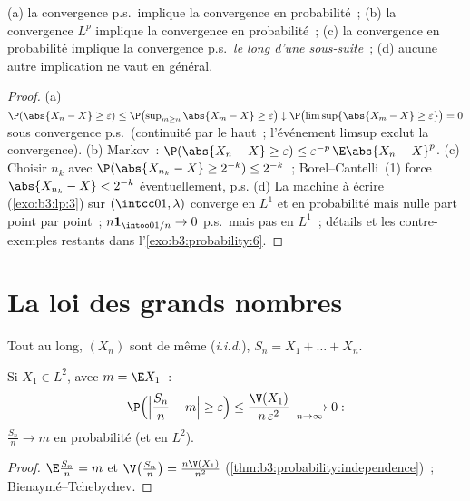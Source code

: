 \begin{proposition}\label{prop:b3:probability:modes}
(a) la convergence p.s.\ implique la convergence en
probabilité~;
(b) la convergence $L^p$ implique la convergence en
probabilité~;
(c) la convergence en probabilité implique la convergence
p.s.\ \emph{le long d'une sous-suite}~;
(d) aucune autre implication ne vaut en général.
\end{proposition}

\begin{proof}
(a) $\P(\abs{X_n - X} \geq \varepsilon) \leq
\P\bigl(\sup_{m\geq n}\abs{X_m - X} \geq \varepsilon\bigr)
\downarrow \P\bigl(\limsup\{\abs{X_m - X} \geq
\varepsilon\}\bigr) = 0$ sous convergence p.s.\ (continuité
par le haut~; l'événement limsup exclut la convergence).
(b) Markov~: $\P(\abs{X_n - X} \geq \varepsilon) \leq
\varepsilon^{-p}\,\E\abs{X_n - X}^p$. (c) Choisir $n_k$ avec
$\P(\abs{X_{n_k} - X} \geq 2^{-k}) \leq 2^{-k}$~;
Borel--Cantelli~(1) force $\abs{X_{n_k} - X} < 2^{-k}$
éventuellement, p.s. (d) La machine à écrire
(\cref{exo:b3:lp:3}) sur $(\intcc01, \lambda)$ converge en
$L^1$ et en probabilité mais nulle part point par point~;
$n\mathbf 1_{\intoo0{1/n}} \to 0$ p.s.\ mais pas en $L^1$~;
détails et les contre-exemples restants dans
l'\cref{exo:b3:probability:6}.
\end{proof}

\section{La loi des grands nombres}

Tout au long, $(X_n)$ sont  de même 
(\emph{i.i.d.}), $S_n = X_1 + \dots + X_n$.

\begin{theorem}
\label{thm:b3:probability:wlln}
Si $X_1 \in L^2$, avec $m = \E X_1$~:
\[
\P\Bigl(\Bigl|\frac{S_n}{n} - m\Bigr| \geq
\varepsilon\Bigr) \leq
\frac{\V(X_1)}{n\,\varepsilon^2}
\xrightarrow[n\to\infty]{} 0 :
\]
$\frac{S_n}n \to m$ en probabilité (et en
$L^2$).
\end{theorem}

\begin{proof}
$\E\frac{S_n}n = m$ et $\V\bigl(\frac{S_n}n\bigr) =
\frac{n\V(X_1)}{n^2}$
(\cref{thm:b3:probability:independence})~;
Bienaymé--Tchebychev.
\end{proof}


